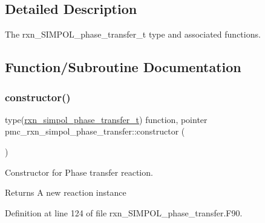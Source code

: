 \subsection{Detailed Description}
The rxn\+\_\+\+S\+I\+M\+P\+O\+L\+\_\+phase\+\_\+transfer\+\_\+t type and associated functions. 

\subsection{Function/\+Subroutine Documentation}
\mbox{\label{namespacepmc__rxn__simpol__phase__transfer_a5ef9b6f52ac7c70ea3b93d8b947b8f03}} 
\subsubsection{\texorpdfstring{constructor()}{constructor()}}
{\footnotesize\ttfamily type(\mbox{\hyperlink{structpmc__rxn__simpol__phase__transfer_1_1rxn__simpol__phase__transfer__t}{rxn\+\_\+simpol\+\_\+phase\+\_\+transfer\+\_\+t}}) function, pointer pmc\+\_\+rxn\+\_\+simpol\+\_\+phase\+\_\+transfer\+::constructor (\begin{DoxyParamCaption}{ }\end{DoxyParamCaption})\hspace{0.3cm}{\ttfamily [private]}}



Constructor for Phase transfer reaction. 

\begin{DoxyReturn}{Returns}
A new reaction instance 
\end{DoxyReturn}


Definition at line 124 of file rxn\+\_\+\+S\+I\+M\+P\+O\+L\+\_\+phase\+\_\+transfer.\+F90.

\mbox{\label{namespacepmc__rxn__simpol__phase__transfer_a717a70c576f34f6d3ae773bcc0a12ca0}} 
